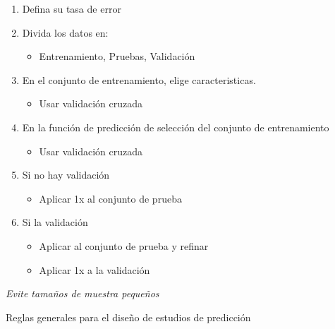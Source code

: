 \documentclass[
]{article}
\providecommand{\tightlist}{%
  \setlength{\itemsep}{0pt}\setlength{\parskip}{0pt}}
\begin{document}
\begin{enumerate}
\def\labelenumi{\arabic{enumi}.}
\tightlist
\item
  Defina su tasa de error
\item
  Divida los datos en:

  \begin{itemize}
  \tightlist
  \item
    Entrenamiento, Pruebas, Validación
  \end{itemize}
\item
  En el conjunto de entrenamiento, elige caracteristicas.

  \begin{itemize}
  \tightlist
  \item
    Usar validación cruzada
  \end{itemize}
\item
  En la función de predicción de selección del conjunto de entrenamiento

  \begin{itemize}
  \tightlist
  \item
    Usar validación cruzada
  \end{itemize}
\item
  Si no hay validación

  \begin{itemize}
  \tightlist
  \item
    Aplicar 1x al conjunto de prueba
  \end{itemize}
\item
  Si la validación

  \begin{itemize}
  \tightlist
  \item
    Aplicar al conjunto de prueba y refinar
  \item
    Aplicar 1x a la validación
  \end{itemize}
\end{enumerate}

\emph{Evite tamaños de muestra pequeños}

Reglas generales para el diseño de estudios de predicción
\end{document}
